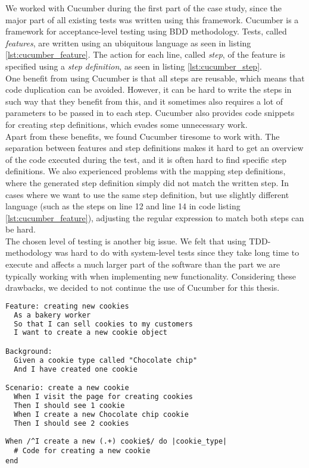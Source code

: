 
We worked with Cucumber during the first part of the case study, since
the major part of all existing tests was written using this framework.
Cucumber is a framework for acceptance-level testing using BDD
methodology. Tests, called \emph{features}, are written using an
ubiquitous language as seen in listing \ref{lst:cucumber_feature}. The
action for each line, called \emph{step}, of the feature is specified
using a \emph{step definition}, as seen in listing
\ref{lst:cucumber_step}.\cite{web:cucumber}\\

One benefit from using Cucumber is that all steps are reusable, which
means that code duplication can be avoided. However, it can be hard to
write the steps in such way that they benefit from this, and it
sometimes also requires a lot of parameters to be passed in to each
step. Cucumber also provides code snippets for creating step
definitions, which evades some unnecessary work.\\

Apart from these benefits, we found Cucumber tiresome to work with. The
separation between features and step definitions makes it hard to get an
overview of the code executed during the test, and it is often hard to
find specific step definitions. We also experienced problems with the
mapping step definitions, where the generated step definition simply did
not match the written step. In cases where we want to use the same step
definition, but use slightly different language (such as the steps on
line 12 and line 14 in code listing \ref{lst:cucumber_feature}),
adjusting the regular expression to match both steps can be hard.\\

The chosen level of testing is another big issue. We felt that using
TDD-methodology was hard to do with system-level tests since they take
long time to execute and affects a much larger part of the software than
the part we are typically working with when implementing new
functionality. Considering these drawbacks, we decided to not continue
the use of Cucumber for this thesis.\\


\begin{lstlisting}[caption=Example of a Cucumber test.,
                   label=lst:cucumber_feature, float=t, language=HTML]
Feature: creating new cookies
  As a bakery worker
  So that I can sell cookies to my customers
  I want to create a new cookie object

Background:
  Given a cookie type called "Chocolate chip"
  And I have created one cookie

Scenario: create a new cookie
  When I visit the page for creating cookies
  Then I should see 1 cookie
  When I create a new Chocolate chip cookie
  Then I should see 2 cookies
\end{lstlisting}


\begin{lstlisting}[caption=Cucumber step definition for the step on row 13 in code listing \ref{lst:cucumber_feature}.,
                   label=lst:cucumber_step, float=t]
When /^I create a new (.+) cookie$/ do |cookie_type|
  # Code for creating a new cookie
end
\end{lstlisting}
